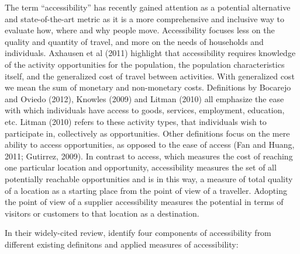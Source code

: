 The term “accessibility” has recently gained attention as a potential alternative and state-of-the-art metric as it is a more comprehensive and inclusive way to evaluate how, where and why people move. Accessibility focuses less on the quality and quantity of travel, and more on the needs of households and individuals. Axhausen et al (2011) highlight that accessibility requires knowledge of the activity opportunities for the population, the population characteristics itself, and the generalized cost of travel between activities. With generalized cost we mean the sum of monetary and non-monetary costs. Definitions by Bocarejo and Oviedo (2012), Knowles (2009) and Litman (2010) all emphasize the ease with which individuals have access to goods, services, employment, education, etc. Litman (2010) refers to these activity types, that individuals wish to participate in, collectively as opportunities. Other definitions focus on the mere ability to access opportunities, as opposed to the ease of access (Fan and Huang, 2011; Gutirrez, 2009). In contrast to access, which measures the cost of reaching one particular location and opportunity, accessibility measures the set of all potentially reachable opportunities and is in this way, a measure of total quality of a location as a starting place from the point of view of a traveller. Adopting the point of view of a supplier accessibility measures the potential in terms of visitors or customers to that location as a destination.



In their widely-cited review, \citet{Geurs2004AccessibilityReview} identify four components of accessibility 
from different existing definitons and applied measures of accessibility:

